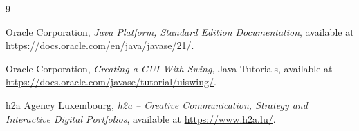 \documentclass[11pt,a4paper]{report}
\begin{document}
\begin{thebibliography}{9}
Oracle Corporation, \textit{Java Platform, Standard Edition Documentation}, available at \url{https://docs.oracle.com/en/java/javase/21/}.

Oracle Corporation, \textit{Creating a GUI With Swing}, Java Tutorials, available at \url{https://docs.oracle.com/javase/tutorial/uiswing/}.

h2a Agency Luxembourg, \textit{h2a -- Creative Communication, Strategy and Interactive Digital Portfolios}, available at \url{https://www.h2a.lu/}.
\end{thebibliography}
\end{document}
